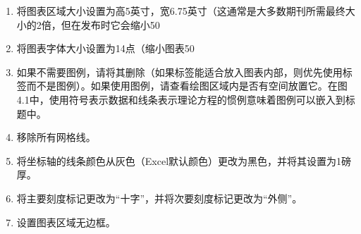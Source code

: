 \begin{enumerate}
\item 将图表区域大小设置为高5英寸，宽6.75英寸（这通常是大多数期刊所需最终大小的2倍，但在发布时它会缩小50%

\item 将图表字体大小设置为14点（缩小图表50%

\item 如果不需要图例，请将其删除（如果标签能适合放入图表内部，则优先使用标签而不是图例）。如果使用图例，请查看绘图区域内是否有空间放置它。在图4.1中，使用符号表示数据和线条表示理论方程的惯例意味着图例可以嵌入到标题中。

\item 移除所有网格线。

\item 将坐标轴的线条颜色从灰色（Excel默认颜色）更改为黑色，并将其设置为1磅厚。

\item 将主要刻度标记更改为“十字”，并将次要刻度标记更改为“外侧”。

\item 设置图表区域无边框。


\end{enumerate}
